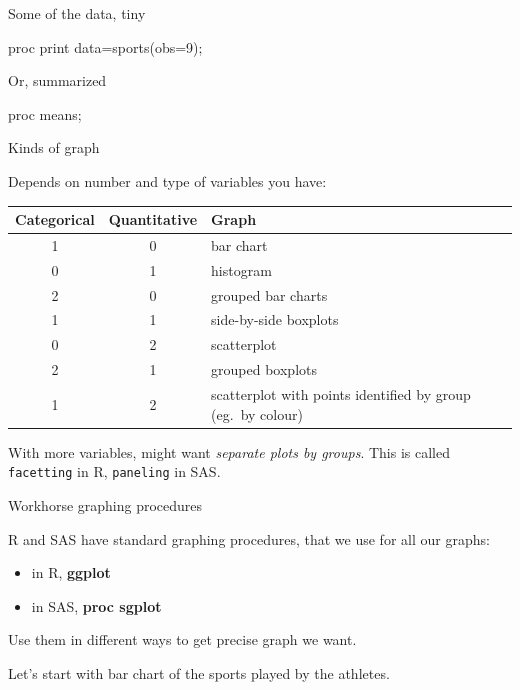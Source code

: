\documentclass[unknownkeysallowed]{beamer}\usepackage[]{graphicx}\usepackage[]{color}
\begin{document}
\begin{frame}[fragile]{Some of the data, tiny}
  
  \begin{Sascode}[store=ga]
proc print data=sports(obs=9);
  \end{Sascode}
  
  
\end{frame}

\begin{frame}[fragile]{Or, summarized}
  
  \begin{Sascode}[store=gb]
proc means;    
  \end{Sascode}
  
  
\end{frame}

\begin{frame}[fragile]{Kinds of graph}
  
  Depends on number and type of variables you have:
  
  \begin{center}
  \begin{tabular}{ccp{}}
    Categorical & Quantitative & Graph\\
    \hline
    1 & 0 & bar chart\\
    0 & 1 & histogram\\
    2 & 0 & grouped bar charts\\
    1 & 1 & side-by-side boxplots\\
    0 & 2 & scatterplot\\
    2 & 1 & grouped boxplots\\
    1 & 2 & scatterplot with points identified by group (eg.\ by colour)\\
    \hline
  \end{tabular}
    
  \end{center}
  
  With more variables, might want \emph{separate plots by
    groups}. This is called \texttt{facetting} in R, \texttt{paneling}
  in SAS.
  
\end{frame}

\begin{frame}[fragile]{Workhorse graphing procedures}
  
  R and SAS have standard graphing procedures, that we use for all our
  graphs: 
  
  \begin{itemize}
  \item in R, \textbf{ggplot}
  \item in SAS, \textbf{proc sgplot}
  \end{itemize}
  
  Use them in different ways to get precise graph we want.
  
  Let's start with bar chart of the sports played by the athletes.
  
\end{frame}
\end{document}
